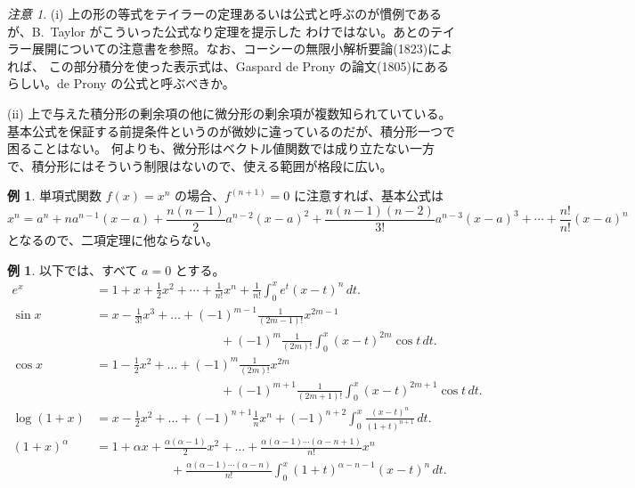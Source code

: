 \documentclass[a4paper]{jsarticle}
\theoremstyle{definition}
\newtheorem{Example}[Theorem]{例}
\theoremstyle{remark}
\newtheorem{Remark}{注意}
\begin{document}
\begin{Remark}
  {\small
(i) 上の形の等式をテイラーの定理あるいは公式と呼ぶのが慣例であるが、B.~Taylor がこういった公式なり定理を提示した
わけではない。あとのテイラー展開についての注意書を参照。なお、コーシーの無限小解析要論(1823)によれば、
この部分積分を使った表示式は、Gaspard de Prony の論文(1805)にあるらしい。de Prony の公式と呼ぶべきか。

(ii) 上で与えた積分形の剰余項の他に微分形の剰余項が複数知られていている。
基本公式を保証する前提条件というのが微妙に違っているのだが、積分形一つで困ることはない。
何よりも、微分形はベクトル値関数では成り立たない一方で、積分形にはそういう制限はないので、使える範囲が格段に広い。
}
\end{Remark}

\begin{Example}
  単項式関数 $f(x) = x^n$ の場合、$f^{(n+1)} = 0$ に注意すれば、基本公式は
  \[
    x^n = a^n + na^{n-1}(x-a) + \frac{n(n-1)}{2} a^{n-2} (x-a)^2
    + \frac{n(n-1)(n-2)}{3!} a^{n-3} (x-a)^3 +
    \cdots + \frac{n!}{n!} (x-a)^n
  \]
となるので、二項定理に他ならない。 
\end{Example}

\begin{Example}
以下では、すべて $a=0$ とする。
\begin{align*}
e^x
&= 1 + x + \frac{1}{2}x^2 + \cdots + \frac{1}{n!}x^n + \frac{1}{n!} \int_0^x e^t(x-t)^n\, dt.\\
\sin x &= x - \frac{1}{3!}x^3 + \dots + (-1)^{m-1}\frac{1}{(2m-1)!} x^{2m-1}\\
&\qquad\qquad\qquad\qquad\qquad+ (-1)^m \frac{1}{(2m)!} \int_0^x (x-t)^{2m}\cos t\, dt.\\
\cos x &= 1 - \frac{1}{2}x^2 + \dots + (-1)^m\frac{1}{(2m)!}x^{2m}\\
&\qquad\qquad\qquad\qquad\qquad+ (-1)^{m+1} \frac{1}{(2m+1)!} \int_0^x (x-t)^{2m+1}\cos t\, dt.\\
\log(1+x) &= x - \frac{1}{2}x^2 + \dots + 
(-1)^{n+1} \frac{1}{n} x^n + (-1)^{n+2} \int_0^x \frac{(x-t)^n}{(1+t)^{n+1}}\,dt.\\
(1+x)^\alpha &= 1 + \alpha x + \frac{\alpha(\alpha-1)}{2}x^2 + \dots 
+ \frac{\alpha(\alpha-1)\cdots(\alpha-n+1)}{n!} x^n\\ 
&\qquad\qquad\qquad+ 
\frac{\alpha(\alpha-1)\cdots(\alpha-n)}{n!} \int_0^x (1+t)^{\alpha-n-1} (x-t)^n\, dt. 
\end{align*} 
\end{Example}
\end{document}
